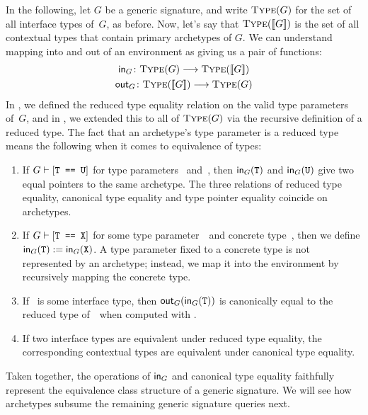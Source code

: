 \documentclass[../generics]{subfiles}
\begin{document}
In the following, let $G$ be a generic signature, and write $\textsc{Type}({G})$ for the set of all interface types of~$G$, as before. Now, let's say that $\textsc{Type}({[\![G]\!]})$ is the set of all contextual types that contain primary archetypes of $G$. We can understand mapping into and out of an environment as giving us a pair of functions:
\begin{gather*}
\mathsf{in}_G\colon\textsc{Type}({G})\longrightarrow\textsc{Type}({[\![G]\!]})\\
\mathsf{out}_G\colon\textsc{Type}({[\![G]\!]})\longrightarrow\textsc{Type}({G})
\end{gather*}
In , we defined the reduced type equality relation on the valid type parameters of~$G$, and in , we extended this to all of $\textsc{Type}({G})$ via the recursive definition of a reduced type. The fact that an archetype's type parameter is a reduced type means the following when it comes to equivalence of types:
\begin{enumerate}
\item If $G\vdash[\texttt{T == U}]$ for type parameters \tT~and~\tU, then $\mathsf{in}_G(\texttt{T})$ and $\mathsf{in}_G(\texttt{U})$ give two equal pointers to the same archetype. The three relations of reduced type equality, canonical type equality and type pointer equality coincide on archetypes.

\item If $G\vdash[\texttt{T == X}]$ for some type parameter~\tT\ and concrete type~\tX, then we define $\mathsf{in}_G(\texttt{T}):=\mathsf{in}_G(\texttt{X})$. A type parameter fixed to a concrete type is not represented by an archetype; instead, we map it into the environment by recursively mapping the concrete type.

\item If \tT\ is some interface type, then $\mathsf{out}_G(\mathsf{in}_G(\texttt{T}))$ is canonically equal to the reduced type of~\tT\ when computed with .

\item If two interface types are equivalent under reduced type equality, the corresponding contextual types are equivalent under canonical type equality.
\end{enumerate}
Taken together, the operations of $\mathsf{in}_G$ and canonical type equality faithfully represent the equivalence class structure of a generic signature. We will see how archetypes subsume the remaining generic signature queries next.
\end{document}
